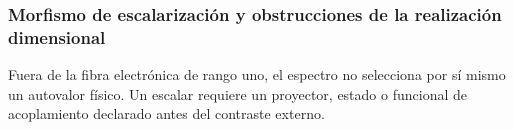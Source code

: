 \let\section\subsection
\let\subsection\subsubsection
\let\subsubsection\paragraph
\let\clearpage\relax

\endgroup
\begingroup
\let\chapter\section
\let\section\subsection
\let\subsection\subsubsection
\let\subsubsection\paragraph
\let\clearpage\relax

\endgroup

\section{Morfismo de escalarización y obstrucciones de la realización dimensional}
Fuera de la fibra electrónica de rango uno, el espectro no selecciona por sí
mismo un autovalor físico. Un escalar requiere un proyector, estado o funcional
de acoplamiento declarado antes del contraste externo.
